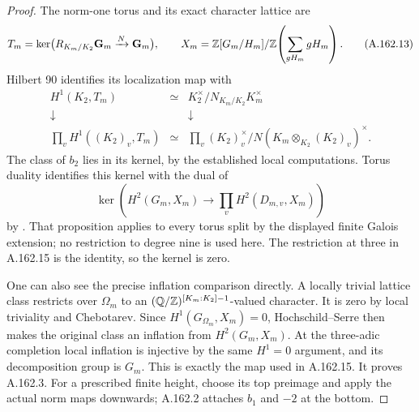 \begin{proof}
The norm-one torus and its exact character lattice are
\[
 T_m=\ker\bigl(R_{K_m/K_2}\mathbf G_m\xrightarrow{N}\mathbf G_m\bigr),
 \qquad X_m=\mathbb Z[G_m/H_m]/\mathbb Z\!\left(\sum_{gH_m}gH_m\right).
\tag{A.162.13}
\]
Hilbert 90 identifies its localization map with
\[
\begin{array}{ccc}
 H^1(K_2,T_m)&\simeq&K_2^\times/N_{K_m/K_2}K_m^\times\\
 \downarrow&&\downarrow\\
 \displaystyle\prod_vH^1((K_2)_v,T_m)&\simeq&
 \displaystyle\prod_v (K_2)_v^\times/
       N(K_m\otimes_{K_2}(K_2)_v)^\times.
\end{array}
\tag{A.162.14}
\]
The class of \(b_2\) lies in its kernel, by the established local
computations.  Torus duality identifies this kernel with the dual of
\[
 \ker\left(H^2(G_m,X_m)\longrightarrow
                      \prod_v H^2(D_{m,v},X_m)\right)
\tag{A.162.15}
\]
by \cite[Proposition 6.4]{BIR_Oki2026Norm}.
That proposition applies to every torus split by the displayed finite
Galois extension; no restriction to degree nine is used here.
The restriction at three in A.162.15 is the identity, so the kernel
is zero.

One can also see the precise inflation comparison directly.
A locally trivial lattice class restricts over \(\Omega_m\) to an
\((\mathbb Q/\mathbb Z)^{[K_m:K_2]-1}\)-valued character.  It is zero by local
triviality and Chebotarev.  Since
\(H^1(G_{\Omega_m},X_m)=0\), Hochschild--Serre then makes the
original class an inflation from \(H^2(G_m,X_m)\).
At the three-adic completion local inflation is injective by the same
\(H^1=0\) argument, and its decomposition group is \(G_m\).
This is exactly the map used in A.162.15.
It proves A.162.3.  For a prescribed finite height, choose its top
preimage and apply the actual norm maps downwards; A.162.2 attaches
\(b_1\) and \(-2\) at the bottom.
\end{proof}

